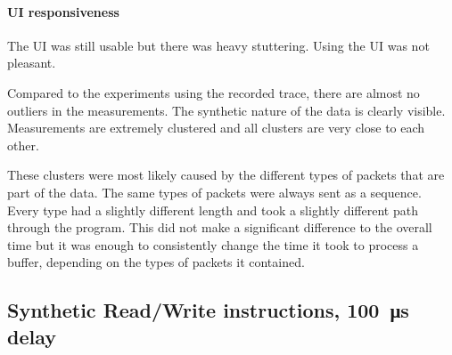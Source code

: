 \paragraph{UI responsiveness}

The UI was still usable but there was heavy stuttering. Using the UI was not pleasant.
\bigbreak

Compared to the experiments using the recorded trace, there are almost no outliers in the measurements.
The synthetic nature of the data is clearly visible. Measurements are extremely clustered and all
clusters are very close to each other.

These clusters were most likely caused by the different types of packets that are part of the data.
The same types of packets were always sent as a sequence. Every type had a slightly different length
and took a slightly different path through the program. This did not make a significant difference to
the overall time but it was enough to consistently change the time it took to process a buffer,
depending on the types of packets it contained.

\subsection{Synthetic Read/Write instructions, \SI{100}{\micro\second} delay}
\label{evaluation/results/synthetic-read-write-instructions-100us-delay}

